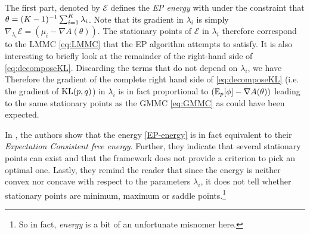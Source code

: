%
%
The first part, denoted by $\mathcal E$ defines the \emph{EP energy} with
%
%
under the constraint that $\theta=(K-1)^{-1} \sum_{i=1}^{K}\lambda_i$. Note that its gradient in $\lambda_i$ is simply $\nabla_{\lambda_i}\mathcal E = (\mu_i-\nabla A(\theta))$. 
The stationary points of $\mathcal E$ in $\lambda_i$ therefore correspond to the LMMC \eqref{eq:LMMC} that the EP algorithm attempts to satisfy.
It is also interesting to briefly look at the remainder of the right-hand side of \eqref{eq:decomposeKL}. Discarding the terms that do not depend on $\lambda_i$, we have
%
%
Therefore the gradient of the complete right hand side of \eqref{eq:decomposeKL} (i.e. the gradient of $\mathrm{KL}\!\left(p,q\right)$) in $\lambda_i$ is in fact proportional to $(\mathbb E_{p}[\phi]-\nabla A(\theta))$ leading to the same stationary points as the GMMC \eqref{eq:GMMC} as could have been expected.
%

In \citet{heskes05}, the authors show that the energy \eqref{EP-energy} is in fact equivalent to their \emph{Expectation Consistent free energy}. Further, they indicate that several stationary points can exist and that the framework does not provide a criterion to pick an optimal one. Lastly, they remind the reader that since the energy is neither convex nor concave with respect to the parameters $\lambda_i$, it does not tell whether stationary points are minimum, maximum or saddle points.\footnote{So in fact, \emph{energy} is a bit of an unfortunate misnomer here.} %
%
